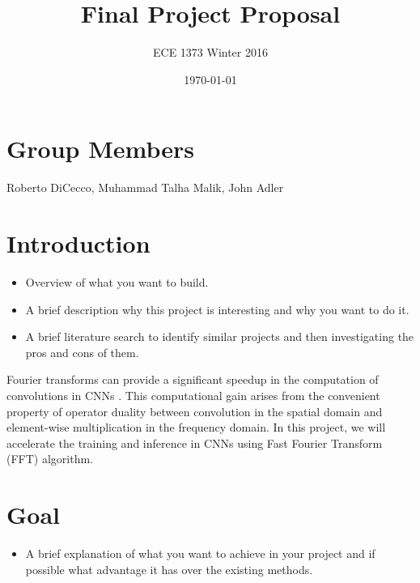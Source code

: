 \documentclass[conference,compsoc]{IEEEtran/IEEEtran}
\title{\bf Final Project Proposal}
\author{ECE 1373 Winter 2016}
\date{\today}
\begin{document}
\maketitle

\section{Group Members}
Roberto DiCecco, Muhammad Talha Malik, John Adler

\section{Introduction}
\begin{itemize}
\item Overview of what you want to build.
\item A brief description why this project is interesting and why you want to do it.
\item A brief literature search to identify similar projects and then investigating the pros and cons of them.
\end{itemize}

Fourier transforms can provide a significant speedup in the computation of convolutions in CNNs \cite{FFT1, FFT2}. This computational gain arises from the convenient property of operator duality between convolution in the spatial domain and element-wise multiplication in the frequency domain. In this project, we will accelerate the training and inference in CNNs using Fast Fourier Transform (FFT) algorithm.


\section{Goal}
\begin{itemize}
\item
A brief explanation of what you want to achieve in your project and if possible what
advantage it has over the existing methods.
\end{itemize}
\end{document}
